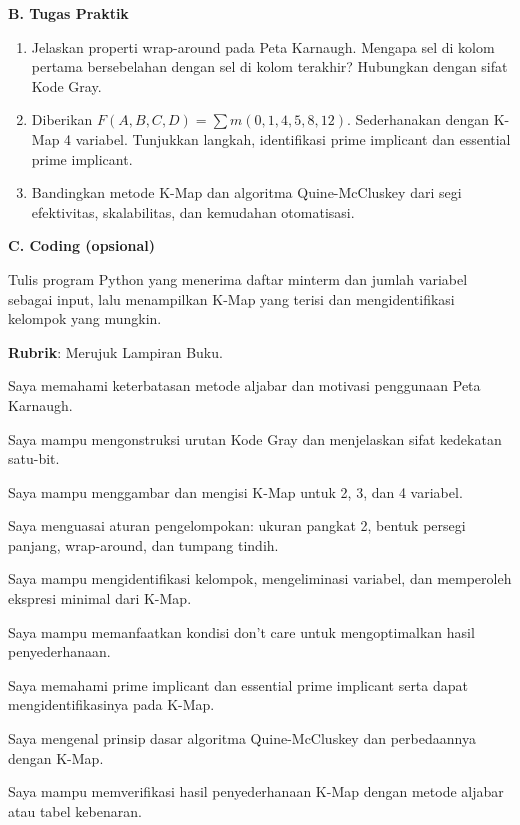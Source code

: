 \documentclass[../main]{subfiles}
\begin{document}
\begin{asesmen}
\textbf{B. Tugas Praktik}
\begin{enumerate}
  \item Jelaskan properti wrap-around pada Peta Karnaugh. Mengapa sel di kolom pertama bersebelahan dengan sel di kolom terakhir? Hubungkan dengan sifat Kode Gray.
  \item Diberikan $F(A,B,C,D) = \sum m(0, 1, 4, 5, 8, 12)$. Sederhanakan dengan K-Map 4 variabel. Tunjukkan langkah, identifikasi prime implicant dan essential prime implicant.
  \item Bandingkan metode K-Map dan algoritma Quine-McCluskey dari segi efektivitas, skalabilitas, dan kemudahan otomatisasi.
\end{enumerate}

\textbf{C. Coding (opsional)}

Tulis program Python yang menerima daftar minterm dan jumlah variabel sebagai input, lalu menampilkan K-Map yang terisi dan mengidentifikasi kelompok yang mungkin.

\textbf{Rubrik}: Merujuk Lampiran Buku.
\end{asesmen}


\begin{checklist}
  \item Saya memahami keterbatasan metode aljabar dan motivasi penggunaan Peta Karnaugh.
  \item Saya mampu mengonstruksi urutan Kode Gray dan menjelaskan sifat kedekatan satu-bit.
  \item Saya mampu menggambar dan mengisi K-Map untuk 2, 3, dan 4 variabel.
  \item Saya menguasai aturan pengelompokan: ukuran pangkat 2, bentuk persegi panjang, wrap-around, dan tumpang tindih.
  \item Saya mampu mengidentifikasi kelompok, mengeliminasi variabel, dan memperoleh ekspresi minimal dari K-Map.
  \item Saya mampu memanfaatkan kondisi don't care untuk mengoptimalkan hasil penyederhanaan.
  \item Saya memahami prime implicant dan essential prime implicant serta dapat mengidentifikasinya pada K-Map.
  \item Saya mengenal prinsip dasar algoritma Quine-McCluskey dan perbedaannya dengan K-Map.
  \item Saya mampu memverifikasi hasil penyederhanaan K-Map dengan metode aljabar atau tabel kebenaran.
\end{checklist}
\end{document}
